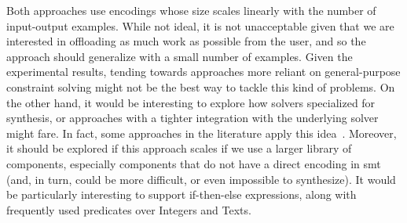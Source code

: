 Both approaches use encodings whose size scales linearly with the number of
input-output examples.
While not ideal, it is not unacceptable given that we are interested in
offloading as much work as possible from the user, and so the approach should
generalize with a small number of examples.
Given the experimental results, tending towards approaches more reliant on
general-purpose constraint solving might not be the best way to tackle this kind
of problems.
On the other hand, it would be interesting to explore how solvers specialized
for synthesis, or approaches with a tighter integration with the underlying
solver might fare.
In fact, some approaches in the literature apply this
idea~\cite{Feng:2018:PSU,Abate:2018:CMT}.
Moreover, it should be explored if this approach scales if we use a larger
library of components, especially components that do not have a direct encoding
in \gls{smt} (and, in turn, could be more difficult, or even impossible to
synthesize).
It would be particularly interesting to support if-then-else expressions, along
with frequently used predicates over Integers and Texts.
